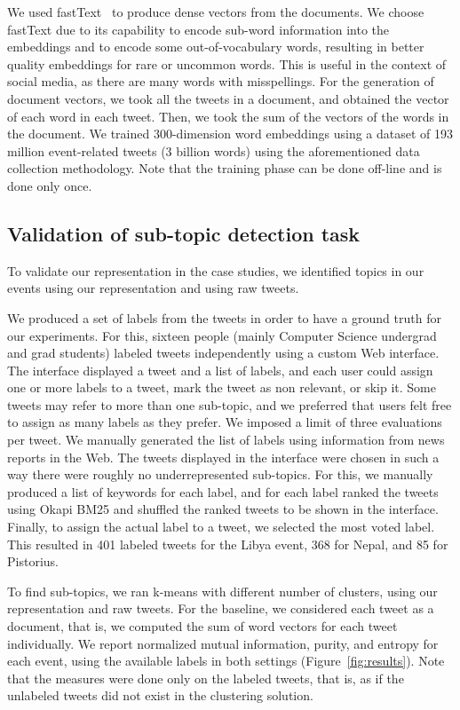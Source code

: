 
We used fastText~\cite{bojanowski2016enriching} to produce dense vectors from
the documents.
%
We choose fastText due to its capability to encode sub-word information into the
embeddings and to encode some out-of-vocabulary words, resulting in better
quality embeddings for rare or uncommon words. 
%
This is useful in the context of social media, as there are many words with
misspellings. 
%
For the generation of document vectors, we took all the tweets in a document,
and obtained the vector of each word in each tweet.
%
Then, we took the sum of the vectors of the words in the document.
%
We trained 300-dimension word embeddings using a dataset of 193 million
event-related tweets (3 billion words) using the aforementioned data collection
methodology.
%
Note that the training phase can be done off-line and is done only once.


\subsection{Validation of sub-topic detection task}

To validate our representation in the case studies, we identified topics in our
events using our representation and using raw tweets.

We produced a set of labels from the tweets in order to have a ground truth for
our experiments. 
%
For this, sixteen people (mainly Computer Science undergrad and grad students)
labeled tweets independently using a custom Web interface. 
%
The interface displayed a tweet and a list of labels, and each user could assign
one or more labels to a tweet, mark the tweet as non relevant, or skip it.
%
Some tweets may refer to more than one sub-topic, and we preferred that users
felt free to assign as many labels as they prefer.
%
We imposed a limit of three evaluations per tweet.
%
We manually generated the list of labels using information from news reports in
the Web.
%
The tweets displayed in the interface were chosen in such a way there were
roughly no underrepresented sub-topics.
%
For this, we manually produced a list of keywords for each label, and for each
label ranked the tweets using Okapi BM25 and shuffled the ranked tweets to be
shown in the interface.
%
Finally, to assign the actual label to a tweet, we selected the most voted
label.
%
This resulted in 401 labeled tweets for the Libya event, 368 for Nepal, and 85
for Pistorius.


To find sub-topics, we ran k-means with different number of clusters, using our
representation and raw tweets.
%
For the baseline, we considered each tweet as a document, that is, we computed
the sum of word vectors for each tweet individually.
%
We report normalized mutual information, purity, and entropy for each event,
using the available labels in both settings (Figure~\ref{fig:results}).
%
Note that the measures were done only on the labeled tweets, that is, as if the
unlabeled tweets did not exist in the clustering solution.



